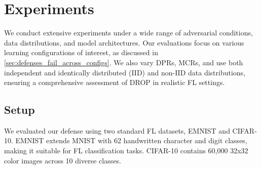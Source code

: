 \section{Experiments}
\label{sec:experiments}

We conduct extensive experiments under a wide range of adversarial conditions, data distributions, and model architectures. Our evaluations focus on various learning configurations of interest, as discussed in  \cref{sec:defenses_fail_across_configs}. We also vary DPRs, MCRs, and use both independent and identically distributed (IID) and non-IID data distributions, ensuring a comprehensive assessment of DROP in realistic FL settings.

\subsection{Setup}


We evaluated our defense using two standard FL datasets, EMNIST and CIFAR-10. EMNIST \citep{cohen2017emnistextensionmnisthandwritten} extends MNIST \citep{mnist} with 62 handwritten character and digit classes, making it suitable for FL classification tasks. CIFAR-10 \citep{krizhevsky2009learning} contains 60,000 32x32 color images across 10 diverse classes. 

